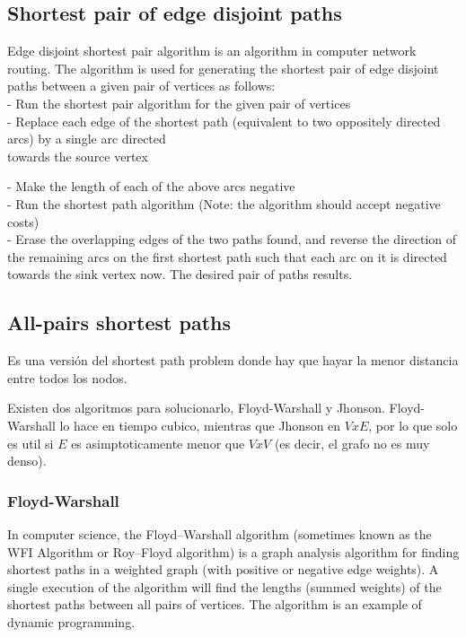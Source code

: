 \documentclass[10pt,letterpaper,twocolumn,twosided]{article}
\begin{document}
\subsection{Shortest pair of edge disjoint paths}

Edge disjoint shortest pair algorithm is an algorithm in computer network routing. The algorithm 
is used for generating the shortest pair of edge disjoint paths between a given pair of vertices as follows:\\

- Run the shortest pair algorithm for the given pair of vertices\\

- Replace each edge of the shortest path (equivalent to two oppositely directed arcs) by a single arc directed \\
towards the source vertex

- Make the length of each of the above arcs negative\\

- Run the shortest path algorithm (Note: the algorithm should accept negative costs)\\

- Erase the overlapping edges of the two paths found, and reverse the direction of the remaining arcs on the 
first shortest path such that each arc on it is directed towards the sink vertex now. The desired pair of 
paths results.\\


\subsection{All-pairs shortest paths}

Es una versión del shortest path problem donde hay que hayar la menor distancia entre todos los nodos.

Existen dos algoritmos para solucionarlo, Floyd-Warshall y Jhonson. Floyd-Warshall lo hace en tiempo cubico, 
mientras que Jhonson en $V x E$, por lo que solo es util si $E$ es asimptoticamente menor que $V x V$ (es decir,
el grafo no es muy denso).

\subsubsection{Floyd-Warshall}

In computer science, the Floyd–Warshall algorithm (sometimes known as the WFI Algorithm or Roy–Floyd algorithm)
is a graph analysis algorithm for finding shortest paths in a weighted graph (with positive or negative edge weights).
A single execution of the algorithm will find the lengths (summed weights) of the shortest paths between all pairs
of vertices. The algorithm is an example of dynamic programming.\\ 
\end{document}
